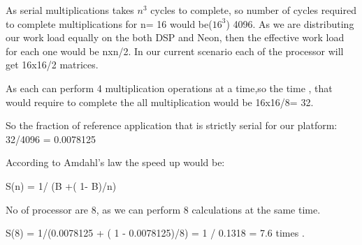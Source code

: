As serial multiplications takes $n^3$ cycles to complete, so number of cycles required to complete multiplications  for n= 16  would be($16^3$) 4096.
As  we are distributing our work load equally on the both DSP and Neon,  then the effective work load for each one would be nxn/2. In our current scenario each of the processor will get 16x16/2 matrices.

As each can perform 4 multiplication operations at a time,so the time , that would require to complete the  all multiplication would be 16x16/8=  32. 

So the fraction  of reference application that is strictly serial for our platform: 32/4096 = 0.0078125

According to Amdahl's law the speed up would be:

S(n) = 1/ (B +( 1- B)/n) 

No of processor are 8, as we can perform 8 calculations at the same time. 

S(8) = 1/(0.0078125 + ( 1 - 0.0078125)/8) = 1 / 0.1318 = 7.6 times . 

 
